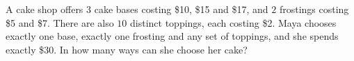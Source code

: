 A cake shop offers $3$ cake bases costing \$10, \$15 and \$17, and $2$ frostings costing \$5 and \$7. There are also $10$ distinct toppings, each costing \$2. Maya chooses exactly one base, exactly one frosting and any set of toppings, and she spends exactly \$30. In how many ways can she choose her cake?
